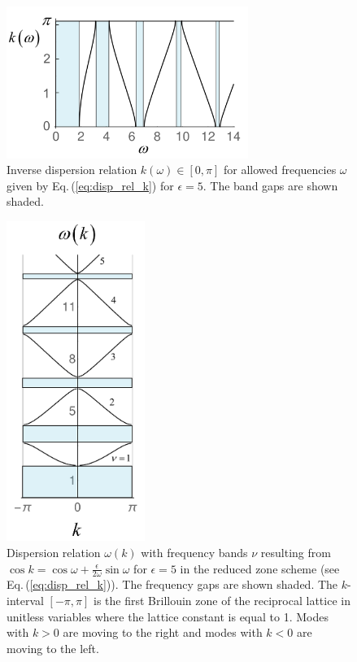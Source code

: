 %
\begin{figure}
    \centering
    \includegraphics[width=0.7\textwidth, keepaspectratio]{figures/system/komega.png}
    \caption{Inverse dispersion relation $k(\omega) \in [0,\pi]$ 
    for allowed frequencies $\omega$ given by Eq.\,(\ref{eq:disp_rel_k}) for $\epsilon=5$. 
    The band gaps are shown shaded.}  
    \label{fig:komega}
\end{figure}

\begin{figure}
    \centering
    \includegraphics[width=0.4\textwidth, keepaspectratio]{figures/system/omegak.png}
    \caption{Dispersion relation $\omega(k)$ with frequency bands $\nu$ resulting from 
    $\cos k = \cos{\omega} + \frac{\epsilon}{2 \omega} \sin{\omega}$ for $\epsilon=5$
    in the reduced zone scheme (see Eq.\,(\ref{eq:disp_rel_k})). 
    The frequency gaps are shown shaded. The $k$-interval $[-\pi,\pi]$ 
    is the first Brillouin zone of the reciprocal lattice in 
    unitless variables where the lattice constant is equal to 1.
    Modes with $k>0$ are moving to the right and modes with $k<0$
    are moving to the left.}
    \label{fig:omegak}
\end{figure}

